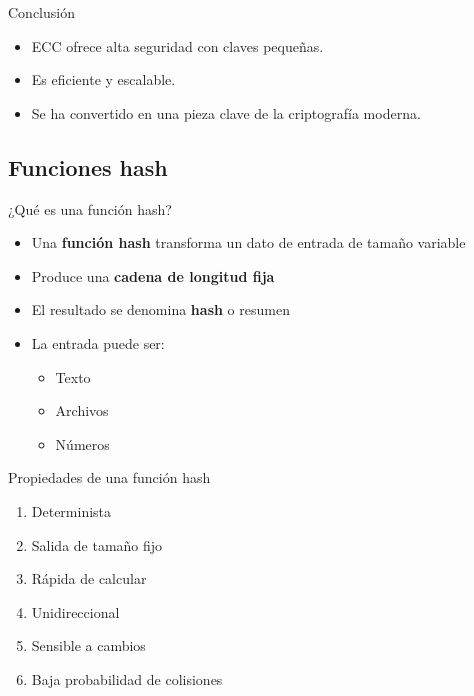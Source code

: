\documentclass{beamer}
\begin{document}
\begin{frame}{Conclusión}
\begin{itemize}
  \item ECC ofrece alta seguridad con claves pequeñas.
  \item Es eficiente y escalable.
  \item Se ha convertido en una pieza clave de la criptografía moderna.
\end{itemize}
\end{frame}


\subsection{Funciones hash}
\label{hash}

\begin{frame}{¿Qué es una función hash?}
\begin{itemize}
  \item Una \textbf{función hash} transforma un dato de entrada de tamaño variable
  \item Produce una \textbf{cadena de longitud fija}
  \item El resultado se denomina \textbf{hash} o resumen
  \item La entrada puede ser:
  \begin{itemize}
    \item Texto
    \item Archivos
    \item Números
    \end{itemize}
\end{itemize}
\end{frame}

\begin{frame}{Propiedades de una función hash}
\begin{enumerate}
  \item Determinista
  \item Salida de tamaño fijo
  \item Rápida de calcular
  \item Unidireccional
  \item Sensible a cambios
  \item Baja probabilidad de colisiones
\end{enumerate}
\end{frame}
\end{document}
